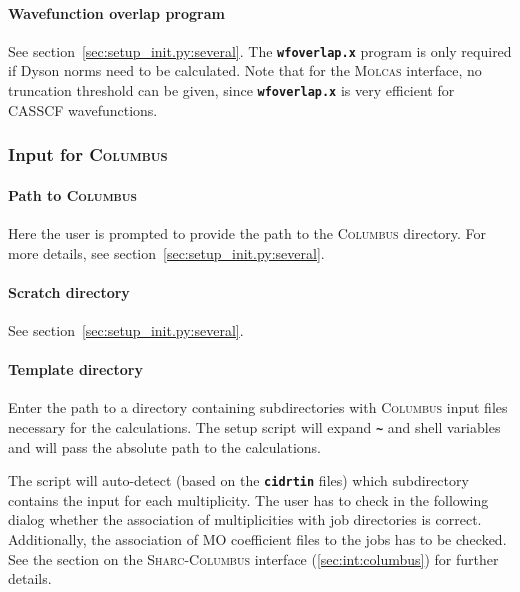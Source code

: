 \documentclass[a4paper,10pt,DIV=15,openany]{scrbook}
\newcommand{\sharc}{\textsc{Sharc}}
\newcommand{\ttt}[1]{\textbf{\texttt{#1}}}
\begin{document}
\paragraph{Wavefunction overlap program}

See section~\ref{sec:setup_init.py:several}. The \ttt{wfoverlap.x} program is only required if Dyson norms need to be calculated. Note that for the \textsc{Molcas} interface, no truncation threshold can be given, since \ttt{wfoverlap.x} is very efficient for CASSCF wavefunctions.


\subsubsection{Input for \textsc{Columbus}}\label{sec:setup_init.py:columbus}

\paragraph{Path to \textsc{Columbus}}

Here the user is prompted to provide the path to the \textsc{Columbus} directory. 
For more details, see section~\ref{sec:setup_init.py:several}.

\paragraph{Scratch directory}

See section~\ref{sec:setup_init.py:several}.

\paragraph{Template directory}

Enter the path to a directory containing subdirectories with \textsc{Columbus} input files necessary for the calculations. The setup script will expand \ttt{\textasciitilde} and shell variables and will pass the absolute path to the calculations.

The script will auto-detect (based on the \ttt{cidrtin} files) which subdirectory contains the input for each multiplicity. The user has to check in the following dialog whether the association of multiplicities with job directories is correct. Additionally, the association of MO coefficient files to the jobs has to be checked. See the section on the \sharc-\textsc{Columbus} interface (\ref{sec:int:columbus}) for further details. 
\end{document}
